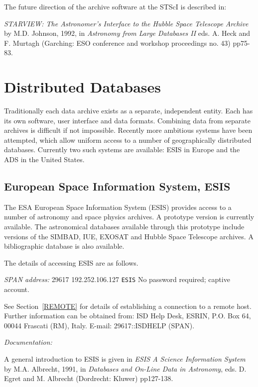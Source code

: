 \documentclass[twoside,11pt]{article}
\newcommand{\xlabel}[1]{}
\begin{document}
The future direction of the archive software at the STScI is described
in:

{\it STARVIEW: The Astronomer's Interface to the Hubble Space Telescope
Archive} by M.D. Johnson, 1992, in {\it Astronomy from Large Databases
II} eds. A. Heck and F. Murtagh (Garching: ESO conference and workshop
proceedings no. 43) pp75-83.


\section{Distributed Databases\xlabel{distributed_databases}}

Traditionally each data archive exists as a separate, independent
entity. Each has its own software, user interface and data formats.
Combining data from separate archives is difficult if not impossible.
Recently more ambitious systems have been attempted, which allow
uniform access to a number of geographically distributed databases.
Currently two such systems are available: ESIS in Europe and the ADS
in the United States.

\subsection{European Space Information System, ESIS
\xlabel{european_space_information_system_esis}}

The ESA European Space Information System (ESIS) provides access to a
number of astronomy and space physics archives. A prototype version
is currently available. The astronomical databases available through
this prototype include versions of the SIMBAD, IUE, EXOSAT and Hubble
Space Telescope archives. A bibliographic database is also available.

The details of accessing ESIS are as follows.

{\it SPAN address: } 29617
 192.252.106.127
 \verb-ESIS-
 No password required; captive account.

See Section~\ref{REMOTE} for details of establishing a connection to
a remote host. Further information can be obtained from: ISD Help Desk,
ESRIN, P.O. Box 64, 00044 Frascati (RM), Italy. E-mail: 29617::ISDHELP
(SPAN).

{\it Documentation:}

A general introduction to ESIS is given in {\it ESIS A Science
Information System} by M.A. Albrecht, 1991, in {\it Databases and
On-Line Data in Astronomy}, eds. D. Egret and M. Albrecht (Dordrecht:
Kluwer) pp127-138.
\end{document}
